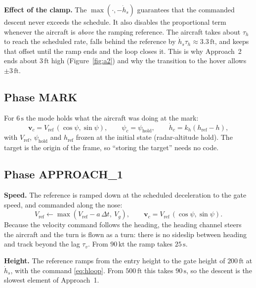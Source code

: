 \documentclass[11pt,a4paper]{article}
\newcommand{\un}[1]{\,\mathrm{#1}}
\begin{document}
\textbf{Effect of the clamp.} The $\max(\cdot,-\dot h_s)$ guarantees that the
commanded descent never exceeds the schedule. It also disables the
proportional term whenever the aircraft is \emph{above} the ramping reference.
The aircraft takes about $\tau_h$ to reach the scheduled rate, falls behind
the reference by $\dot h_s\tau_h\approx3.3\un{ft}$, and keeps that offset
until the ramp ends and the loop closes it. This is why Approach~2 ends about
$3\un{ft}$ high (Figure~\ref{fig:a2}) and why the transition to the hover
allows $\pm3\un{ft}$.

\subsection{Phase MARK}

For $6\un{s}$ the mode holds what the aircraft was doing at the mark:
\begin{equation}
\mathbf v_c = V_{\text{ref}}\,(\cos\psi,\sin\psi),\qquad
\psi_c=\psi_{\text{hold}},\qquad
\dot h_c = k_h(h_{\text{ref}}-h),
\end{equation}
with $V_{\text{ref}}$, $\psi_{\text{hold}}$ and $h_{\text{ref}}$ frozen at the
initial state (radar-altitude hold). The target is the origin of the frame, so
``storing the target'' needs no code.

\subsection{Phase APPROACH\_1}

\textbf{Speed.} The reference is ramped down at the scheduled deceleration to
the gate speed, and commanded along the nose:
\begin{equation}
V_{\text{ref}} \leftarrow \max(V_{\text{ref}}-a\,\Delta t,\ V_g),
\qquad \mathbf v_c = V_{\text{ref}}\,(\cos\psi,\sin\psi).
\end{equation}
Because the velocity command follows the heading, the heading channel steers
the aircraft and the turn is flown as a turn: there is no sideslip between
heading and track beyond the lag $\tau_v$. From $90\un{kt}$ the ramp takes
$25\un{s}$.

\textbf{Height.} The reference ramps from the entry height to the gate height
of $200\un{ft}$ at $\dot h_s$, with the command \eqref{eq:hloop}. From
$500\un{ft}$ this takes $90\un{s}$, so the descent is the slowest element of
Approach~1.
\end{document}
